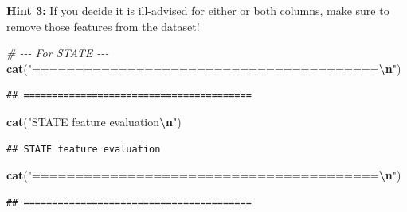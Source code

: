 \documentclass[
]{article}
\newenvironment{Shaded}{\begin{snugshade}}{\end{snugshade}}
\newcommand{\CommentTok}[1]{\textcolor[rgb]{0.56,0.35,0.01}{\textit{#1}}}
\newcommand{\FunctionTok}[1]{\textcolor[rgb]{0.13,0.29,0.53}{\textbf{#1}}}
\newcommand{\NormalTok}[1]{#1}
\newcommand{\OtherTok}[1]{\textcolor[rgb]{0.56,0.35,0.01}{#1}}
\newcommand{\SpecialCharTok}[1]{\textcolor[rgb]{0.81,0.36,0.00}{\textbf{#1}}}
\newcommand{\StringTok}[1]{\textcolor[rgb]{0.31,0.60,0.02}{#1}}
\begin{document}
\textbf{Hint 3: }If you decide it is ill-advised for either or both
columns, make sure to remove those features from the dataset!

\begin{Shaded}
\begin{Highlighting}[]
\CommentTok{\# {-}{-}{-} For STATE {-}{-}{-}}
\FunctionTok{cat}\NormalTok{(}\StringTok{"========================================}\SpecialCharTok{\textbackslash{}n}\StringTok{"}\NormalTok{)}
\end{Highlighting}
\end{Shaded}

\begin{verbatim}
## ========================================
\end{verbatim}

\begin{Shaded}
\begin{Highlighting}[]
\FunctionTok{cat}\NormalTok{(}\StringTok{"STATE feature evaluation}\SpecialCharTok{\textbackslash{}n}\StringTok{"}\NormalTok{)}
\end{Highlighting}
\end{Shaded}

\begin{verbatim}
## STATE feature evaluation
\end{verbatim}

\begin{Shaded}
\begin{Highlighting}[]
\FunctionTok{cat}\NormalTok{(}\StringTok{"========================================}\SpecialCharTok{\textbackslash{}n}\StringTok{"}\NormalTok{)}
\end{Highlighting}
\end{Shaded}

\begin{verbatim}
## ========================================
\end{verbatim}

\begin{Shaded}
\end{Shaded}
\end{document}
